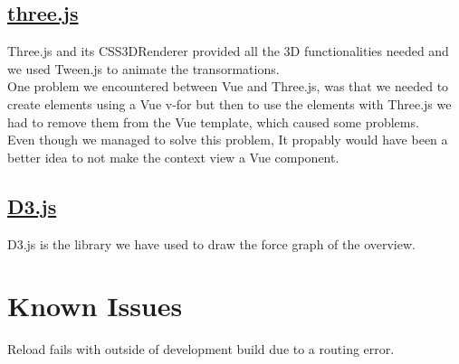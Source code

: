 \documentclass[a4paper]{article}
\begin{document}
\subsection{\href{https://threejs.org/}{three.js}}
Three.js and its CSS3DRenderer provided all the 3D functionalities needed and we used Tween.js to animate the transormations. 
\\One problem we encountered between Vue and Three.js, was that we needed to create elements using a Vue v-for but then to use the elements with Three.js we had to remove them from the Vue template, which caused some problems. \\
Even though  we managed to solve this problem, It propably would have been a better idea to not make the context view a Vue component.
\subsection{\href{https://d3js.org/}{D3.js}}
D3.js is the library we have used to draw the force graph of the overview.
\section{Known Issues}
\enumerate
\item Reload fails with outside of development build due to a routing error.
\enumerate

\end{document}
